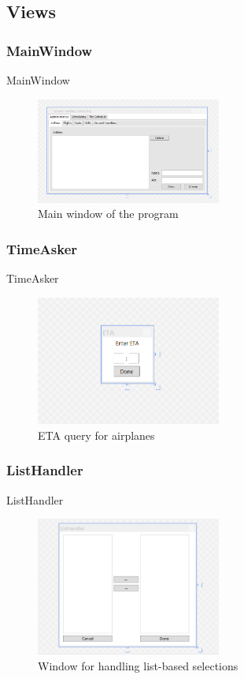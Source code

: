 \subsection{Views}
\subsubsection{MainWindow}
\begin{frame}{MainWindow}{}
    \begin{figure}[H]
        \centering
        \includegraphics[width=230px]{Grafik/mainwindow}
        \caption{\footnotesize Main window of the program}
    \end{figure}
\end{frame}

\subsubsection{TimeAsker}
\begin{frame}{TimeAsker}{}
    \begin{figure}[H]
        \centering
        \includegraphics[width=230px]{Grafik/timeasker}
        \caption{\footnotesize ETA query for airplanes}
    \end{figure}
\end{frame}

\subsubsection{ListHandler}
\begin{frame}{ListHandler}{}
    \begin{figure}[H]
        \centering
        \includegraphics[width=230px]{Grafik/listhandler}
        \caption{\footnotesize Window for handling list-based selections}
    \end{figure}
\end{frame}

